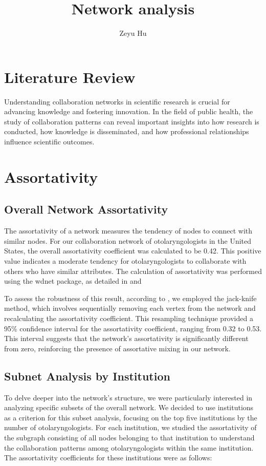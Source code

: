 \documentclass[12pt]{article}
\title{Network analysis}
\author{Zeyu Hu\\
}
\begin{document}
\maketitle

\doublespacing

\section{Literature Review}
Understanding collaboration networks in scientific research is crucial for advancing knowledge and fostering innovation. In the field of public health, the study of collaboration patterns can reveal important insights into how research is conducted, how knowledge is disseminated, and how professional relationships influence scientific outcomes. 
\section{Assortativity}
\subsection{Overall Network Assortativity}

The assortativity of a network measures the tendency of nodes to connect with similar nodes. For our collaboration network of otolaryngologists in the United States, the overall assortativity coefficient was calculated to be 0.42. This positive value indicates a moderate tendency for otolaryngologists to collaborate with others who have similar attributes. The calculation of assortativity was performed using the wdnet package, as detailed in \citep{yuan2021assortativity} and \citep{yuan2023generating}


To assess the robustness of this result, according to \citep{pigorsch2022assortative}, we employed the jack-knife method, which involves sequentially removing each vertex from the network and recalculating the assortativity coefficient. This resampling technique provided a 95\% confidence interval for the assortativity coefficient, ranging from 0.32 to 0.53. This interval suggests that the network's assortativity is significantly different from zero, reinforcing the presence of assortative mixing in our network. 
\subsection{Subnet Analysis by Institution}

To delve deeper into the network’s structure, we were particularly interested in analyzing specific subsets of the overall network. We decided to use institutions as a criterion for this subset analysis, focusing on the top five institutions by the number of otolaryngologists. For each institution, we studied the assortativity of the subgraph consisting of all nodes belonging to that institution to understand the collaboration patterns among otolaryngologists within the same institution. The assortativity coefficients for these institutions were as follows:
\end{document}
